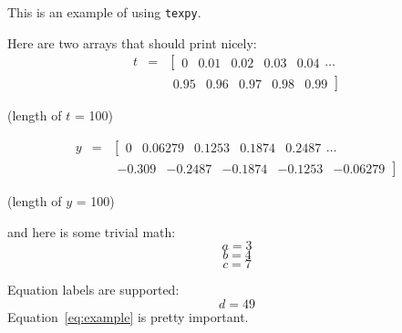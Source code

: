 \documentclass[12pt]{article}
\begin{document}
This is an example of using \texttt{texpy}.


Here are two arrays that should print nicely:
\begin{eqnarray}
t & = &\left[ \begin{array}{ccccc}
0 & 0.01 & 0.02 & 0.03 & 0.04
\end{array} \right.  \ldots \\
& & \left. \begin{array}{ccccc}
0.95 & 0.96 & 0.97 & 0.98 & 0.99
\end{array} \right]
\end{eqnarray}
\begin{center}
(length of $t$ = 100)
\end{center}
\begin{eqnarray}
y & = &\left[ \begin{array}{ccccc}
0 & 0.06279 & 0.1253 & 0.1874 & 0.2487
\end{array} \right.  \ldots \\
& & \left. \begin{array}{ccccc}
-0.309 & -0.2487 & -0.1874 & -0.1253 & -0.06279
\end{array} \right]
\end{eqnarray}
\begin{center}
(length of $y$ = 100)
\end{center}

and here is some trivial math:
\begin{equation}
a = 3
\end{equation}
\begin{equation}
b = 4
\end{equation}
\begin{equation}
c = 7
\end{equation}

Equation labels are supported:
\begin{equation}
d = 49
\label{eq:example}
\end{equation}
Equation~\ref{eq:example} is pretty important.
\end{document}
